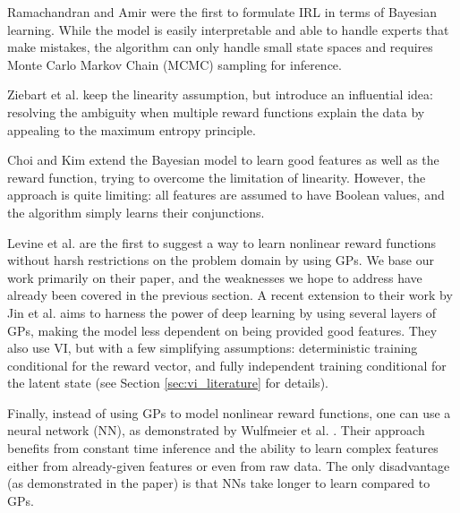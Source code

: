 \documentclass{mprop}
\theoremstyle{definition}
\begin{document}
Ramachandran and Amir \cite{DBLP:conf/ijcai/RamachandranA07} were the first to
formulate IRL in terms of Bayesian learning. While the model is easily
interpretable and able to handle experts that make mistakes, the algorithm can
only handle small state spaces and requires Monte Carlo Markov Chain (MCMC)
sampling for inference.

Ziebart et al. \cite{ziebart2008maximum} keep the linearity assumption, but
introduce an influential idea: resolving the ambiguity when multiple reward
functions explain the data by appealing to the maximum entropy principle.

Choi and Kim \cite{DBLP:conf/ijcai/ChoiK13} extend the Bayesian model to learn
good features as well as the reward function, trying to overcome the limitation
of linearity. However, the approach is quite limiting: all features are assumed
to have Boolean values, and the algorithm simply learns their conjunctions.

Levine et al. \cite{DBLP:conf/nips/LevinePK11} are the first to suggest a way to
learn nonlinear reward functions without harsh restrictions on the problem
domain by using GPs. We base our work primarily on their paper, and the
weaknesses we hope to address have already been covered in the previous section.
A recent extension to their work by Jin et al. \cite{DBLP:conf/uai/JinDAS17}
aims to harness the power of deep learning by using several layers of GPs,
making the model less dependent on being provided good features. They also use
VI, but with a few simplifying assumptions: deterministic training conditional
for the reward vector, and fully independent training conditional for the latent
state (see Section \ref{sec:vi_literature} for details).

Finally, instead of using GPs to model nonlinear reward functions, one can use a
neural network (NN), as demonstrated by Wulfmeier et al.
\cite{wulfmeier2015maximum}. Their approach benefits from constant time
inference and the ability to learn complex features either from already-given
features or even from raw data. The only disadvantage (as demonstrated in the
paper) is that NNs take longer to learn compared to GPs.

\end{document}
